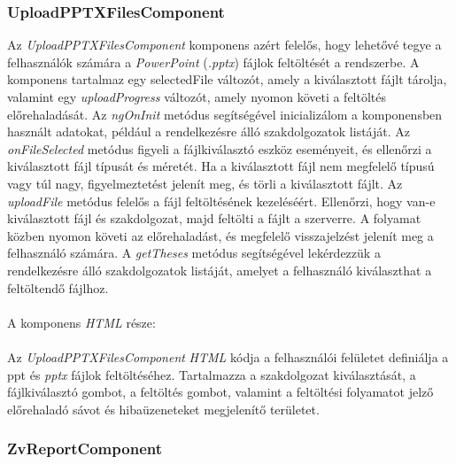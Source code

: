 \subsubsection{UploadPPTXFilesComponent}

Az \textit{UploadPPTXFilesComponent} komponens azért felelős, hogy lehetővé tegye a felhasználók számára a \textit{PowerPoint} (\textit{.pptx}) fájlok feltöltését a rendszerbe. A komponens tartalmaz egy selectedFile változót, amely a kiválasztott fájlt tárolja, valamint egy \textit{uploadProgress} változót, amely nyomon követi a feltöltés előrehaladását. Az \textit{ngOnInit} metódus segítségével inicializálom a komponensben használt adatokat, például a rendelkezésre álló szakdolgozatok listáját. Az \textit{onFileSelected} metódus figyeli a fájlkiválasztó eszköz eseményeit, és ellenőrzi a kiválasztott fájl típusát és méretét. Ha a kiválasztott fájl nem megfelelő típusú vagy túl nagy, figyelmeztetést jelenít meg, és törli a kiválasztott fájlt. Az \textit{uploadFile} metódus felelős a fájl feltöltésének kezeléséért. Ellenőrzi, hogy van-e kiválasztott fájl és szakdolgozat, majd feltölti a fájlt a szerverre. A folyamat közben nyomon követi az előrehaladást, és megfelelő visszajelzést jelenít meg a felhasználó számára. A \textit{getTheses} metódus segítségével lekérdezzük a rendelkezésre álló szakdolgozatok listáját, amelyet a felhasználó kiválaszthat a feltöltendő fájlhoz.
\\
\\
A komponens \textit{HTML} része:\\
\\
Az \textit{UploadPPTXFilesComponent} \textit{HTML} kódja a felhasználói felületet definiálja a ppt és \textit{pptx} fájlok feltöltéséhez. Tartalmazza a szakdolgozat kiválasztását, a fájlkiválasztó gombot, a feltöltés gombot, valamint a feltöltési folyamatot jelző előrehaladó sávot és hibaüzeneteket megjelenítő területet.


\subsubsection{ZvReportComponent}

